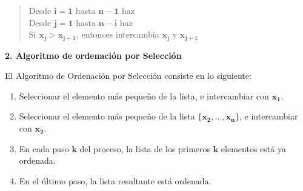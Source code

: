 \documentclass[twoside]{report}
\newcommand{\bs}[1]{\boldsymbol{#1}}
\begin{document}
\vspace*{0.5cm}

    \begin{quotation}
        \hspace*{0cm} \textsf{Desde} $\bs{i=1}$ \textsf{hasta} $\bs{n-1}$ \textsf{haz} \\[1ex]
        \hspace*{0.8cm} \textsf{Desde} $\bs{j=1}$ \textsf{hasta} $\bs{n-i}$ \textsf{haz} \\[1ex]
        \hspace*{1.2cm} \textsf{Si} $\bs{x_j>x_{j+1}}$, \textsf{entonces} intercambia $\bs{x_j}$ y $\bs{x_{j+1}}$ \\[1ex]
    \end{quotation}


\textbf{2. Algoritmo de ordenaci\'{o}n por Selecci\'{o}n}

\vspace{0.5cm}
El Algoritmo de Ordenaci\'{o}n por Selecci\'{o}n consiste en lo siguiente:

        \begin{enumerate}
            \item Seleccionar el elemento m\'{a}s peque\~{n}o de la lista, e intercambiar con $\bs{x_1}$.
            \item Seleccionar el elemento m\'{a}s peque\~{n}o de la lista $\bs{\{x_2,\ldots,x_n\}}$, e intercambiar con $\bs{x_2}$.
            \item En cada paso $\bs{k}$ del proceso, la lista de los primeros $\bs{k}$ elementos est\'{a} ya ordenada.
            \item En el \'{u}ltimo paso, la lista resultante est\'{a} ordenada.
        \end{enumerate}
\end{document}
